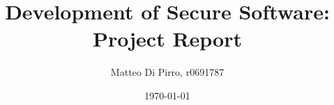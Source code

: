 \documentclass[a4paper,10pt]{article}
\begin{document}
\title{Development of Secure Software: Project Report}
\author{Matteo Di Pirro, r0691787}
\date{\today}

\maketitle






\end{document}
